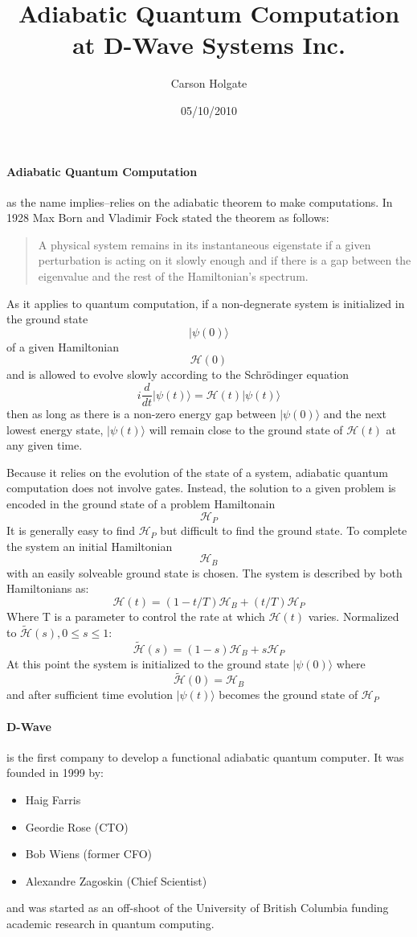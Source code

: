 \documentclass[10pt]{article}
\author{Carson Holgate}
\title{Adiabatic Quantum Computation\\ at D-Wave Systems Inc.}
\date{05/10/2010}
\begin{document}
\maketitle

\paragraph{Adiabatic Quantum Computation}

as the name implies--relies on the adiabatic theorem to make computations. In 1928 Max Born and Vladimir Fock stated the theorem as follows: 
  \begin{quote}
   A physical system remains in its instantaneous eigenstate if a given perturbation is acting on it slowly enough and if there is a gap between the eigenvalue and the rest of the Hamiltonian's spectrum.
  \end{quote}
As it applies to quantum computation, if a non-degnerate system is initialized in the ground state 
  \[|\psi(0)\rangle\] 
of a given Hamiltonian 
  \[\mathcal{H}(0)\] 
and is allowed to evolve slowly according to the Schr\"{o}dinger equation 
  \[ i \frac{d}{dt} |\psi(t)\rangle = \mathcal{H}(t)|\psi(t)\rangle\] 
then as long as there is a non-zero energy gap between \(|\psi(0)\rangle\) and the next lowest energy state, \(|\psi(t)\rangle\) will remain close to the ground state of \(\mathcal{H}(t)\) at any given time.

Because it relies on the evolution of the state of a system, adiabatic quantum computation does not involve gates.   Instead, the solution to a given problem is encoded in the ground state of a problem Hamiltonain 
  \[\mathcal{H}_P\] 
It is generally easy to find \(\mathcal{H}_P\) but difficult to find the ground state. To complete the system an initial Hamiltonian 
  \[\mathcal{H}_B\] 
with an easily solveable ground state is chosen.  The system is described by both Hamiltonians as:  
  \[\mathcal{H}(t) = (1-t/T)\mathcal{H}_B + (t/T)\mathcal{H}_P\] 
Where T is a parameter to control the rate at which \(\mathcal{H}(t)\) varies.  Normalized to \(\tilde{\mathcal{H}}(s), 0 \leq s\leq 1\): 
  \[\tilde{\mathcal{H}}(s) = (1-s)\mathcal{H}_B + s\mathcal{H}_P\]
At this point the system is initialized to the ground state \(|\psi(0)\rangle\) where 
  \[\tilde{\mathcal{H}}(0) = \mathcal{H}_B\] 
and after sufficient time evolution \(|\psi(t)\rangle\) becomes the ground state of \(\mathcal{H}_P\)

\paragraph{D-Wave}
is the first company to develop a functional adiabatic quantum computer.  It was founded in 1999 by: 
  \begin{itemize}
   \item Haig Farris
   \item Geordie Rose (CTO)
   \item Bob Wiens (former CFO)
   \item Alexandre Zagoskin (Chief Scientist)
  \end{itemize}
and was started as an off-shoot of the University of British Columbia funding academic research in quantum computing.  
\end{document}
